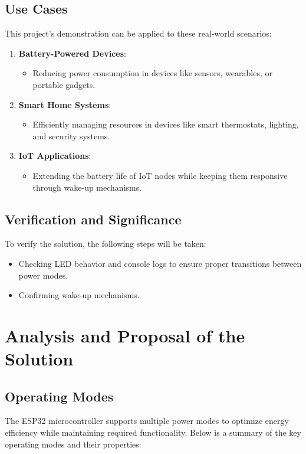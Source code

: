 \documentclass[a4paper, 11pt]{article}
\begin{document}
    
    \subsection{Use Cases}
    This project’s demonstration can be applied to these real-world scenarios:
    \begin{enumerate}
    \item \textbf{Battery-Powered Devices}:
    \begin{itemize}
    \item Reducing power consumption in devices like sensors, wearables, or portable gadgets.
    \end{itemize}
    \item \textbf{Smart Home Systems}:
    \begin{itemize}
    \item Efficiently managing resources in devices like smart thermostats, lighting, and security systems.
    \end{itemize}
    \item \textbf{IoT Applications}:
    \begin{itemize}
    \item Extending the battery life of IoT nodes while keeping them responsive through wake-up mechanisms.
    \end{itemize}
    \end{enumerate}
    
    \subsection{Verification and Significance}
    To verify the solution, the following steps will be taken:
    \begin{itemize}
    \item Checking LED behavior and console logs to ensure proper transitions between power modes.
    \item Confirming wake-up mechanisms.
    \end{itemize}

    \section{Analysis and Proposal of the Solution}

    \subsection{Operating Modes}
    The ESP32 microcontroller supports multiple power modes to optimize energy efficiency while maintaining required functionality. Below is a summary of the key operating modes and their properties:
    
\end{document}
